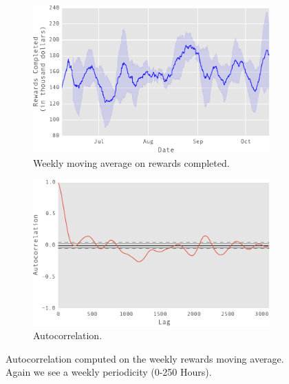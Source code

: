 \begin{figure}[tb]
    \centering
    \begin{subfigure}[b]{0.48\textwidth}
        \centering
        \includegraphics[width=\textwidth]{figures/mac}
        \caption{Weekly moving average on rewards completed.}
        \label{fig:mac}
    \end{subfigure}
    \hfill
    \begin{subfigure}[b]{0.48\textwidth}
        \centering
        \includegraphics[width=\textwidth]{figures/macac}
        \caption{Autocorrelation.}
        \label{fig:macac}
    \end{subfigure}
    \hfill
	\caption{Autocorrelation computed on the weekly rewards moving average. Again we see a weekly periodicity (0-250 Hours).}
	\label{fig:autocorrelation2}
\end{figure}